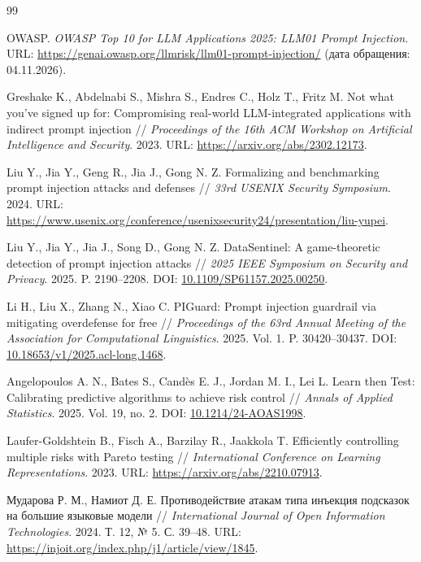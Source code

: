 \documentclass{misisarticle}
\begin{document}
\begin{thebibliography}{99}

 OWASP. \textit{OWASP Top 10 for LLM Applications 2025: LLM01 Prompt Injection}. URL: \url{https://genai.owasp.org/llmrisk/llm01-prompt-injection/} (дата обращения: 04.11.2026).

 Greshake K., Abdelnabi S., Mishra S., Endres C., Holz T., Fritz M. Not what you've signed up for: Compromising real-world LLM-integrated applications with indirect prompt injection // \textit{Proceedings of the 16th ACM Workshop on Artificial Intelligence and Security}. 2023. URL: \url{https://arxiv.org/abs/2302.12173}.

 Liu Y., Jia Y., Geng R., Jia J., Gong N. Z. Formalizing and benchmarking prompt injection attacks and defenses // \textit{33rd USENIX Security Symposium}. 2024. URL: \url{https://www.usenix.org/conference/usenixsecurity24/presentation/liu-yupei}.

 Liu Y., Jia Y., Jia J., Song D., Gong N. Z. DataSentinel: A game-theoretic detection of prompt injection attacks // \textit{2025 IEEE Symposium on Security and Privacy}. 2025. P. 2190--2208. DOI: \href{https://doi.org/10.1109/SP61157.2025.00250}{10.1109/SP61157.2025.00250}.

 Li H., Liu X., Zhang N., Xiao C. PIGuard: Prompt injection guardrail via mitigating overdefense for free // \textit{Proceedings of the 63rd Annual Meeting of the Association for Computational Linguistics}. 2025. Vol. 1. P. 30420--30437. DOI: \href{https://doi.org/10.18653/v1/2025.acl-long.1468}{10.18653/v1/2025.acl-long.1468}.

 Angelopoulos A. N., Bates S., Candès E. J., Jordan M. I., Lei L. Learn then Test: Calibrating predictive algorithms to achieve risk control // \textit{Annals of Applied Statistics}. 2025. Vol. 19, no. 2. DOI: \href{https://doi.org/10.1214/24-AOAS1998}{10.1214/24-AOAS1998}.

 Laufer-Goldshtein B., Fisch A., Barzilay R., Jaakkola T. Efficiently controlling multiple risks with Pareto testing // \textit{International Conference on Learning Representations}. 2023. URL: \url{https://arxiv.org/abs/2210.07913}.

 Мударова Р. М., Намиот Д. Е. Противодействие атакам типа инъекция подсказок на большие языковые модели // \textit{International Journal of Open Information Technologies}. 2024. Т. 12, № 5. С. 39--48. URL: \url{https://injoit.org/index.php/j1/article/view/1845}.


\end{thebibliography}
\end{document}
